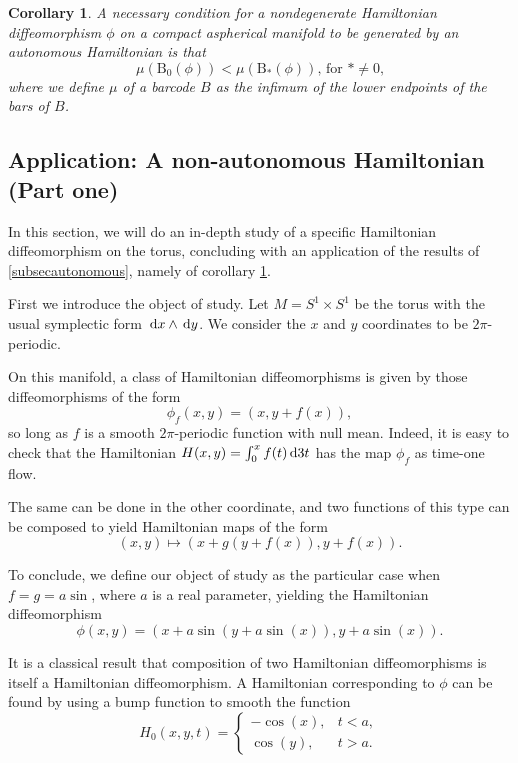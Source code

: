 \documentclass{article}
\newtheorem{corollary}{Corollary}
\theoremstyle{nonumberplain}
\newcommand{\BB}{\mathrm{B}}
\begin{document}
\begin{corollary}\label{corautonomous}
A necessary condition for a nondegenerate Hamiltonian diffeomorphism $\phi$ on a compact aspherical manifold to be generated by an autonomous Hamiltonian is that
\begin{equation}
\mu(\BB_0(\phi)) < \mu(\BB_*(\phi))\text{, for $* \neq 0$,}
\end{equation}
where we define $\mu$ of a barcode $B$ as the infimum of the lower endpoints of the bars of $B$.
\end{corollary}

\subsection{Application: A non-autonomous Hamiltonian (Part one)}

In this section, we will do an in-depth study of a specific Hamiltonian diffeomorphism on the torus, concluding with an application of the results of \ref{subsecautonomous}, namely of corollary \ref{corautonomous}.

First we introduce the object of study. Let $M = S^1 \times S^1$ be the torus with the usual symplectic form $\dl x \wedge \dl y$. We consider the $x$ and $y$ coordinates to be $2\pi$-periodic.

On this manifold, a class of Hamiltonian diffeomorphisms is given by those diffeomorphisms of the form
\begin{equation}
\phi_f(x,y) = (x, y + f(x)),
\end{equation}
so long as $f$ is a smooth $2\pi$-periodic function with null mean. Indeed, it is easy to check that the Hamiltonian $H(x,y) = \int_0^x f(t) \dl3 t$ has the map $\phi_f$ as time-one flow.

The same can be done in the other coordinate, and two functions of this type can be composed to yield Hamiltonian maps of the form
\begin{equation}
(x,y) \mapsto (x + g(y+f(x)), y+f(x)).
\end{equation}

To conclude, we define our object of study as the particular case when $f = g = a \sin$, where $a$ is a real parameter, yielding the Hamiltonian diffeomorphism
\begin{equation}
\phi(x,y) = ( x + a \sin(y + a \sin(x)), y + a \sin(x)).
\end{equation}

It is a classical result that composition of two Hamiltonian diffeomorphisms is itself a Hamiltonian diffeomorphism. A Hamiltonian corresponding to $\phi$ can be found by using a bump function to smooth the function
\begin{equation}
H_0(x,y,t) = \begin{cases}
-\cos(x), & t < a,\\
\cos(y), & t > a.
\end{cases}
\end{equation}
\end{document}
